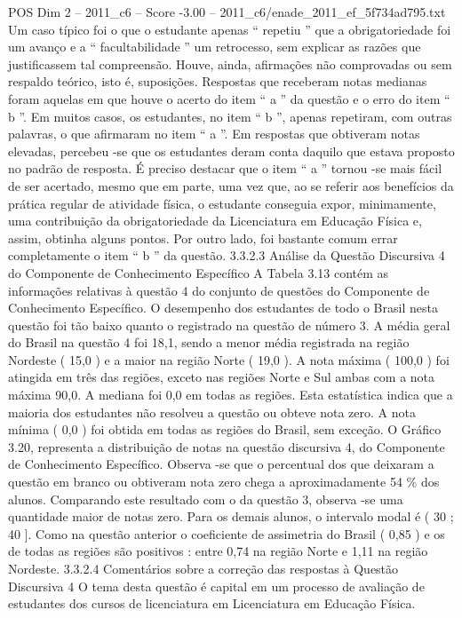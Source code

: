 \begin{textsample}{POS Dim 2 – 2011\_c6 – Score -3.00 – 2011\_c6/enade\_2011\_ef\_5f734ad795.txt}
Um caso típico foi o que o estudante apenas “ repetiu ” que a obrigatoriedade foi um avanço e a “ facultabilidade ” um retrocesso, sem explicar as razões que justificassem tal compreensão.
Houve, ainda, afirmações não comprovadas ou sem respaldo teórico, isto é, suposições.
Respostas que receberam notas medianas foram aquelas em que houve o acerto do item “ a ” da questão e o erro do item “ b ”.
Em muitos casos, os estudantes, no item “ b ”, apenas repetiram, com outras palavras, o que afirmaram no item “ a ”.
Em respostas que obtiveram notas elevadas, percebeu -se que os estudantes deram conta daquilo que estava proposto no padrão de resposta.
É preciso destacar que o item “ a ” tornou -se mais fácil de ser acertado, mesmo que em parte, uma vez que, ao se referir aos benefícios da prática regular de atividade física, o estudante conseguia expor, minimamente, uma contribuição da obrigatoriedade da Licenciatura em Educação Física e, assim, obtinha alguns pontos.
Por outro lado, foi bastante comum errar completamente o item “ b ” da questão. 3.3.2.3 Análise da Questão Discursiva 4 do Componente de Conhecimento Específico A Tabela 3.13 contém as informações relativas à questão 4 do conjunto de questões do Componente de Conhecimento Específico.
O desempenho dos estudantes de todo o Brasil nesta questão foi tão baixo quanto o registrado na questão de número 3.
A média geral do Brasil na questão 4 foi 18,1, sendo a menor média registrada na região Nordeste ( 15,0 ) e a maior na região Norte ( 19,0 ).
A nota máxima ( 100,0 ) foi atingida em três das regiões, exceto nas regiões Norte e Sul ambas com a nota máxima 90,0.
A mediana foi 0,0 em todas as regiões.
Esta estatística indica que a maioria dos estudantes não resolveu a questão ou obteve nota zero.
A nota mínima ( 0,0 ) foi obtida em todas as regiões do Brasil, sem exceção.
O Gráfico 3.20, representa a distribuição de notas na questão discursiva 4, do Componente de Conhecimento Específico.
Observa -se que o percentual dos que deixaram a questão em branco ou obtiveram nota zero chega a aproximadamente 54 \% dos alunos.
Comparando este resultado com o da questão 3, observa -se uma quantidade maior de notas zero.
Para os demais alunos, o intervalo modal é ( 30 ; 40 ].
Como na questão anterior o coeficiente de assimetria do Brasil ( 0,85 ) e os de todas as regiões são positivos : entre 0,74 na região Norte e 1,11 na região Nordeste. 3.3.2.4 Comentários sobre a correção das respostas à Questão Discursiva 4 O tema desta questão é capital em um processo de avaliação de estudantes dos cursos de licenciatura em Licenciatura em Educação Física.

\end{textsample}
